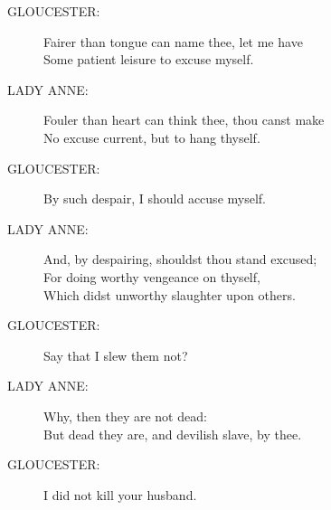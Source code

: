 \documentclass{article}
\begin{document}
\begin{description}
\item[GLOUCESTER:] 
\hspace{1pt}Fairer than tongue can name thee, let me have\\
\hspace{1pt}Some patient leisure to excuse myself.\\
\end{description}
\begin{description}
\item[LADY ANNE:] 
\hspace{1pt}Fouler than heart can think thee, thou canst make\\
\hspace{1pt}No excuse current, but to hang thyself.\\
\end{description}
\begin{description}
\item[GLOUCESTER:] 
\hspace{1pt}By such despair, I should accuse myself.\\
\end{description}
\begin{description}
\item[LADY ANNE:] 
\hspace{1pt}And, by despairing, shouldst thou stand excused;\\
\hspace{1pt}For doing worthy vengeance on thyself,\\
\hspace{1pt}Which didst unworthy slaughter upon others.\\
\end{description}
\begin{description}
\item[GLOUCESTER:] 
\hspace{1pt}Say that I slew them not?\\
\end{description}
\begin{description}
\item[LADY ANNE:] 
\hspace{1pt}Why, then they are not dead:\\
\hspace{1pt}But dead they are, and devilish slave, by thee.\\
\end{description}
\begin{description}
\item[GLOUCESTER:] 
\hspace{1pt}I did not kill your husband.\\
\end{description}
\end{document}
